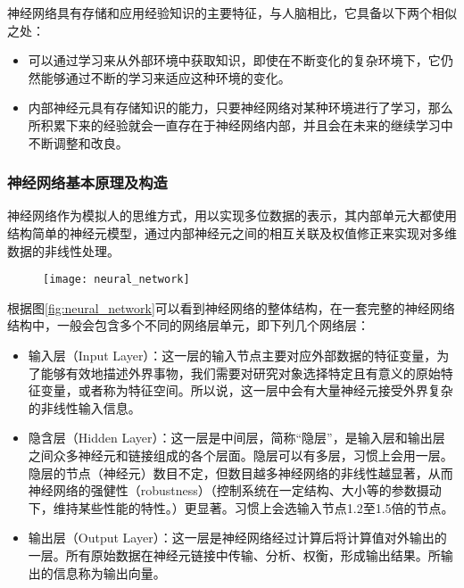 神经网络具有存储和应用经验知识的主要特征，与人脑相比，它具备以下两个相似之处：
\begin{itemize}[noitemsep,topsep=0pt,parsep=0pt,partopsep=0pt]
	\item 可以通过学习来从外部环境中获取知识，即使在不断变化的复杂环境下，它仍然能够通过不断的学习来适应这种环境的变化。
	\item 内部神经元具有存储知识的能力，只要神经网络对某种环境进行了学习，那么所积累下来的经验就会一直存在于神经网络内部，并且会在未来的继续学习中不断调整和改良。
\end{itemize}

\subsubsection{神经网络基本原理及构造}
神经网络作为模拟人的思维方式，用以实现多位数据的表示，其内部单元大都使用结构简单的神经元模型，通过内部神经元之间的相互关联及权值修正来实现对多维数据的非线性处理。

\begin{figure}[!hbp]
  \centering
  \begin{minipage}[b]{0.6\textwidth}
    \captionstyle{\centering}
    \centering
    \texttt{[image: neural\_network]}
  \end{minipage}     
\end{figure}

根据图\ref{fig:neural_network}可以看到神经网络的整体结构，在一套完整的神经网络结构中，一般会包含多个不同的网络层单元，即下列几个网络层：
\begin{itemize}[noitemsep,topsep=0pt,parsep=0pt,partopsep=0pt]
	\item 输入层（Input Layer）：这一层的输入节点主要对应外部数据的特征变量，为了能够有效地描述外界事物，我们需要对研究对象选择特定且有意义的原始特征变量，或者称为特征空间。所以说，这一层中会有大量神经元接受外界复杂的非线性输入信息。
	\item 隐含层（Hidden Layer）：这一层是中间层，简称“隐层”，是输入层和输出层之间众多神经元和链接组成的各个层面。隐层可以有多层，习惯上会用一层。隐层的节点（神经元）数目不定，但数目越多神经网络的非线性越显著，从而神经网络的强健性（robustness）（控制系统在一定结构、大小等的参数摄动下，维持某些性能的特性。）更显著。习惯上会选输入节点1.2至1.5倍的节点。
	\item 输出层（Output Layer）：这一层是神经网络经过计算后将计算值对外输出的一层。所有原始数据在神经元链接中传输、分析、权衡，形成输出结果。所输出的信息称为输出向量。
\end{itemize}

